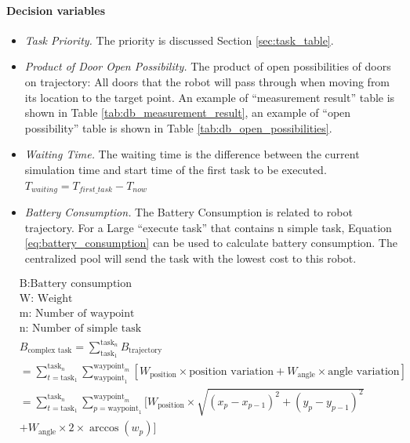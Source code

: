 \paragraph{Decision variables}
\begin{itemize}
\item \textsl{Task Priority.}  The priority is discussed Section \ref{sec:task_table}.
\item \textsl{Product of Door Open Possibility.} The product of open possibilities of doors on trajectory: All doors that the robot will pass through when moving from its location to the target point.
	An example of ``measurement result'' table is shown in Table \ref{tab:db_measurement_result}, an example of ``open possibility'' table is shown in Table \ref{tab:db_open_possibilities}. 
\item \textsl{Waiting Time. } The waiting time is the difference between the current simulation time and start time of the first task to be executed. $T_{waiting} = T_{first\_task} - T_{now}$
\item \textsl{Battery Consumption.} The Battery Consumption is related to robot trajectory. For a Large ``execute task'' that contains n simple task, Equation \ref{eq:battery_consumption} can be used to calculate battery consumption. The centralized pool will send the task with the lowest cost to this robot.
\end{itemize}


\begin{equation}
\begin{aligned}
\label{eq:battery_consumption}
& \mbox{B:Battery consumption } \\
& \mbox{W: Weight } \\
& \mbox{m: Number of waypoint } \\
& \mbox{n: Number of simple task} \\
& B_{\mbox{complex task}} = \sum_{\mbox{task}_1}^{\mbox{task}_n} B_{\mbox{trajectory}} \\
& = \sum_{t = \mbox{task}_1}^{\mbox{task}_n} \sum_{\mbox{waypoint}_1}^{\mbox{waypoint}_m} [W_{\mbox{position}} \times \mbox{position variation}+W_{\mbox{angle}}  \times \mbox{angle variation}]\\
& = \sum_{t = \mbox{task}_1}^{\mbox{task}_n} \sum_{p = \mbox{waypoint}_1}^{\mbox{waypoint}_m} [ W_{\mbox{position}} \times \sqrt{(x_p-x_{p-1} )^2+(y_p-y_{p-1} )^2} \\
&   + W_{\mbox{angle}} \times 2 \times \arccos(w_p)] 
\end{aligned}
\end{equation}



